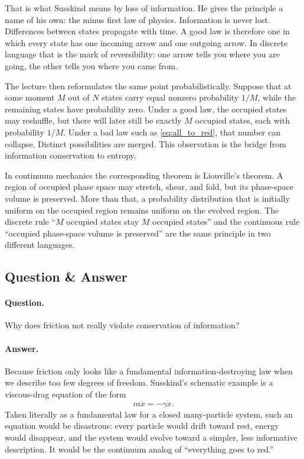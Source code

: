 That is what Susskind means by loss of information. He gives the principle a name of his own: the minus first law of physics. Information is never lost. Differences between states propagate with time. A good law is therefore one in which every state has one incoming arrow and one outgoing arrow. In discrete language that is the mark of reversibility: one arrow tells you where you are going, the other tells you where you came from.

The lecture then reformulates the same point probabilistically. Suppose that at some moment \(M\) out of \(N\) states carry equal nonzero probability \(1/M\), while the remaining states have probability zero. Under a good law, the occupied states may reshuffle, but there will later still be exactly \(M\) occupied states, each with probability \(1/M\). Under a bad law such as \eqref{eq:all_to_red}, that number can collapse. Distinct possibilities are merged. This observation is the bridge from information conservation to entropy.

In continuum mechanics the corresponding theorem is Liouville's theorem. A region of occupied phase space may stretch, shear, and fold, but its phase-space volume is preserved. More than that, a probability distribution that is initially uniform on the occupied region remains uniform on the evolved region. The discrete rule ``\(M\) occupied states stay \(M\) occupied states'' and the continuous rule ``occupied phase-space volume is preserved'' are the same principle in two different languages.

\subsection{Question \& Answer}

\paragraph{Question.} Why does friction not really violate conservation of information?

\paragraph{Answer.} Because friction only looks like a fundamental information-destroying law when we describe too few degrees of freedom. Susskind's schematic example is a viscous-drag equation of the form
\begin{equation}
m\ddot x=-\gamma \dot x.
\end{equation}
Taken literally as a fundamental law for a closed many-particle system, such an equation would be disastrous: every particle would drift toward rest, energy would disappear, and the system would evolve toward a simpler, less informative description. It would be the continuum analog of ``everything goes to red.''

